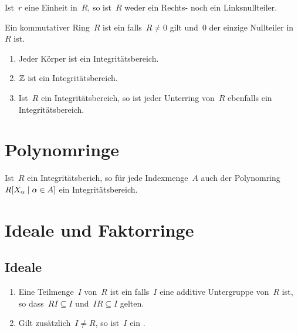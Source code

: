 \begin{proposition}
  Ist~$r$ eine Einheit in~$R$, so ist~$R$ weder ein Rechts- noch ein Linksnullteiler.
\end{proposition}

\begin{definition}
  Ein kommutativer Ring~$R$ ist ein  falls~$R \neq 0$ gilt und~$0$ der einzige Nullteiler in~$R$ ist.
\end{definition}

\begin{example}
  \leavevmode
  \begin{enumerate}
    \item
      Jeder Körper ist ein Integritätsbereich.
    \item
      $\mathbb{Z}$ ist ein Integritätsbereich.
    \item
      Ist~$R$ ein Integritätsbereich, so ist jeder Unterring von~$R$ ebenfalls ein Integritätsbereich.
  \end{enumerate}
\end{example}





\section{Polynomringe}

\begin{proposition}
  Ist~$R$ ein Integritätsberich, so für jede Indexmenge~$A$ auch der Polynomring~$R[X_\alpha \suchthat \alpha \in A]$ ein Integritätsbereich.
\end{proposition}





\section{Ideale und Faktorringe}



\subsection{Ideale}

\begin{definition}
  \leavevmode
  \begin{enumerate}
    \item
      Eine Teilmenge~$I$ von~$R$ ist ein  falls~$I$ eine additive Untergruppe von~$R$ ist, so dass~$RI \subseteq I$ und~$IR \subseteq I$ gelten.
    \item
      Gilt zusätzlich~$I \neq R$, so ist~$I$ ein .
  \end{enumerate}
\end{definition}

